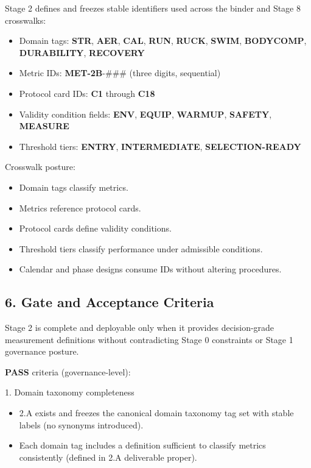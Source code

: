\documentclass[10pt]{article}
\begin{document}
Stage 2 defines and freezes stable identifiers used across the binder and Stage 8 crosswalks:

\begin{itemize}
\item Domain tags: \textbf{STR}, \textbf{AER}, \textbf{CAL}, \textbf{RUN}, \textbf{RUCK}, \textbf{SWIM}, \textbf{BODYCOMP}, \textbf{DURABILITY}, \textbf{RECOVERY}
\item Metric IDs: \textbf{MET-2B}-\#\#\# (three digits, sequential)
\item Protocol card IDs: \textbf{C1} through \textbf{C18}
\item Validity condition fields: \textbf{ENV}, \textbf{EQUIP}, \textbf{WARMUP}, \textbf{SAFETY}, \textbf{MEASURE}
\item Threshold tiers: \textbf{ENTRY}, \textbf{INTERMEDIATE}, \textbf{SELECTION-READY}
\end{itemize}

Crosswalk posture:

\begin{itemize}
\item Domain tags classify metrics.
\item Metrics reference protocol cards.
\item Protocol cards define validity conditions.
\item Threshold tiers classify performance under admissible conditions.
\item Calendar and phase designs consume IDs without altering procedures.
\end{itemize}

\subsection*{6. Gate and Acceptance Criteria}

Stage 2 is complete and deployable only when it provides decision-grade measurement definitions without contradicting Stage 0 constraints or Stage 1 governance posture.

\textbf{PASS} criteria (governance-level):

1. Domain taxonomy completeness

\begin{itemize}
\item 2.A exists and freezes the canonical domain taxonomy tag set with stable labels (no synonyms introduced).
\item Each domain tag includes a definition sufficient to classify metrics consistently (defined in 2.A deliverable proper).
\end{itemize}
\end{document}
